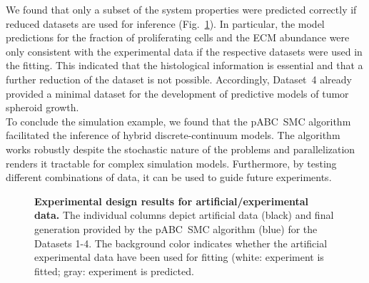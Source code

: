 \documentclass[10pt,letterpaper]{article}
\begin{document}
We found that only a subset of the system properties were predicted correctly if reduced datasets are used for inference (Fig.~\ref{fig: experimental design using 2D model}). In particular, the model predictions for the fraction of proliferating cells and the ECM abundance were only consistent with the experimental data if the respective datasets were used in the fitting. This indicated that the histological information is essential and that a further reduction of the dataset is not possible. Accordingly, Dataset~4 already provided a minimal dataset  for the development of predictive models of tumor spheroid growth.
%
\\[2ex]
\noindent To conclude the simulation example, we found that the pABC~SMC algorithm facilitated the inference of hybrid discrete-continuum models. The algorithm works robustly despite the stochastic nature of the problems and parallelization renders it tractable for complex simulation models. Furthermore, by testing different combinations of data, it can be used to guide future experiments.

\begin{figure}[t]
\begin{adjustwidth}{-2in}{0in} %
\vspace*{0.5cm}
\caption{{\bf Experimental design results for artificial/experimental data.}
The individual columns depict artificial data (black) and final generation provided by the pABC~SMC algorithm (blue) for the Datasets 1-4. The background color indicates whether the artificial experimental data have been used for fitting (white: experiment is fitted; gray: experiment is predicted.}
\label{fig: experimental design using 2D model}
\end{adjustwidth}
\end{figure}
\end{document}
